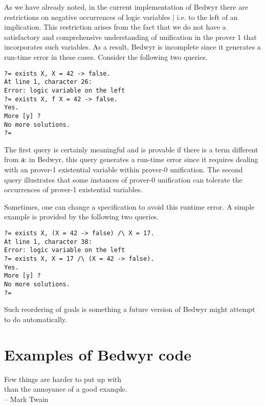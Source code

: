 \documentclass{article}
\begin{document}
As we have already noted, in the current implementation of Bedwyr
there are restrictions on negative occurrences of logic variables |
i.e. to the left of an implication.
This restriction arises from the fact that we do not
have a satisfactory and comprehensive understanding of unification in
the prover 1 that incorporates such variables.  As a result, Bedwyr
is incomplete since it generates a run-time error in these cases.
Consider the following two queries.
\begin{verbatim}
?= exists X, X = 42 -> false.
At line 1, character 26:
Error: logic variable on the left
?= exists X, f X = 42 -> false.
Yes.
More [y] ?
No more solutions.
?=
\end{verbatim}
The first query is certainly meaningful and is provable if there is a
term different from {\tt a}: in Bedwyr, this query generates a
run-time error since it requires dealing with an prover-1
existential variable within prover-0 unification. The second query illustrates
that some instances of prover-0 unification can tolerate the
occurrences of prover-1 existential variables.

Sometimes, one can change a specification to avoid this runtime
error.  A simple example is provided by the following two queries.
\begin{verbatim}
?= exists X, (X = 42 -> false) /\ X = 17.
At line 1, character 38:
Error: logic variable on the left
?= exists X, X = 17 /\ (X = 42 -> false).
Yes.
More [y] ? 
No more solutions.
?=
\end{verbatim}
Such reordering of goals is something a future version of Bedwyr might
attempt to do automatically.




\section{Examples of Bedwyr code}

\begin{flushright}
Few things are harder to put up with \\
than the annoyance of a good example. \\ -- Mark Twain
\end{flushright}
\end{document}
